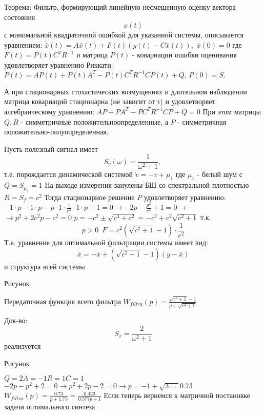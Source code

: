 \documentclass[preprint,russian,a5paper,10pt,twoside,mediummath]{ncc}
\begin{document}
Теорема: Фильтр, формирующий линейную несмещенную  оценку вектора состояния \[x(t)\] с минимальной квадратичной ошибкой для указанной системы, описывается уравнением: $\dot{\bar{x}}(t)=A\bar{x}(t)+F(t)(y(t)-C\bar{x}(t)),\,\,\bar{x}(0)=0$ где $F(t)=P(t){{C}^{T}}{{R}^{-1}}$  и матрица $P(t)$ - ковариации ошибки оценивания удовлетворяет уравнению Риккати:$\dot{P}(t)=AP(t)+P(t){{A}^{T}}-P(t){{C}^{T}}{{R}^{-1}}CP(t)+Q,\,P(0)=S.$
\par А при стационарных стохастических возмущениях и длительном наблюдении матрица ковариаций стационарна (не зависит от t) и удовлетворяет алгебраическому уравнению: $AP+P{{A}^{T}}-P{{C}^{T}}{{R}^{-1}}CP+Q=0$  При этом матрицы $Q,R$ - симметричные положительноопределенные, а $P$ - симметричная положительно-полуопределенная.
\par Пусть полезный сигнал имеет \[{{S}_{v}}(\omega )=\frac{1}{{{\omega }^{2}}+1},\,\] т.е. порождается динамической системой $\dot{v}=-v+{{\mu }_{1}}$ где ${{\mu }_{1}}$ - белый шум с $Q={{S}_{{{\mu }_{1}}}}=1$ 
На выходе измерения занулены БШ со спектральной плотностью $R={{S}_{f}}={{c}^{2}}$  
Тогда стационарное решение $P$ удовлетворяет уравнению:$-1\cdot p-1\cdot p-p\cdot 1\cdot \frac{1}{{{c}^{2}}}\cdot 1\cdot p+1=0\to -2p-\frac{{{p}^{2}}}{{{c}^{2}}}+1=0\to $ 
$\to {{p}^{2}}+2{{c}^{2}}p-{{c}^{2}}=0\,\,p=-{{c}^{2}}\pm \sqrt{{{c}^{4}}+{{c}^{2}}}=-{{c}^{2}}+{{c}^{2}}\sqrt{{{c}^{2}}+1}$ т.к. \[p>0\,\,\,F={{c}^{2}}(\sqrt{{{c}^{2}}+1}-1)\cdot \frac{1}{{{c}^{2}}}\] Т.е. уравнение для оптимальной фильтрации системы имеет вид: \[\dot{\bar{x}}=-\bar{x}+(\sqrt{{{c}^{2}}+1}-1)(y-\bar{x})\] и структура всей системы 


\par 
\par	Рисунок
\par

Передаточная функция всего фильтра ${{W}_{filtra}}(p)=\frac{\sqrt{{{c}^{2}}+1}-1}{p+\sqrt{{{c}^{2}}+1}}$

Док-во: \[{{S}_{x}}=\frac{2}{{{\omega }^{2}}+1}\] реализуется 

\par 
\par	Рисунок
\par

$Q=2A=-1R=1C=1$
$-2p-{{p}^{2}}+2=0\to {{p}^{2}}+2p-2=0\to p=-1+\sqrt{3=}0.73$
${{W}_{filtra}}(p)=\frac{0.73}{p+1.73}=\frac{0.423}{0.577p+1}$ 
Если теперь вернемся к матричной постановке задачи оптимального синтеза 
\end{document}
